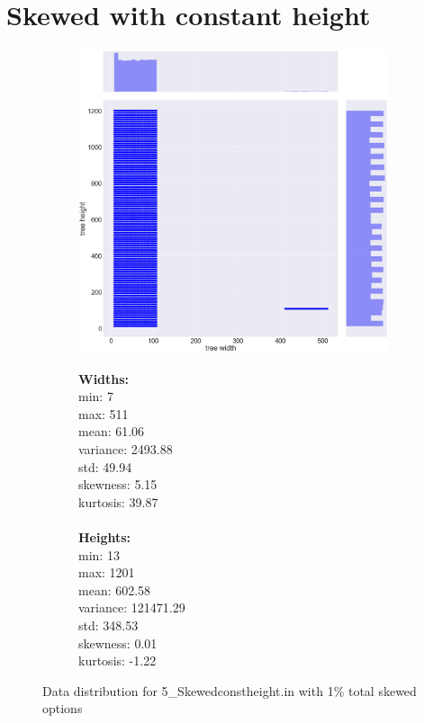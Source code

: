 \section{Skewed with constant height}
\begin{figure}[H]
\centering
\begin{subfigure}{.8\textwidth}
	\includegraphics[width=.9\textwidth]{img/5_SKEWEDCONSTHEIGHT_plot.png}
\end{subfigure}%
\begin{subfigure}{.2\textwidth}
  \centering
  \begin{minipage}{1\textwidth}
\textbf{Widths:}
\\
min: 7
\\
max: 511
\\
mean: 61.06
\\
variance: 2493.88
\\
std: 49.94
\\
skewness: 5.15
\\
kurtosis: 39.87
\\\\
\textbf{Heights:}
\\
min: 13
\\
max: 1201
\\
mean: 602.58
\\
variance: 121471.29
\\
std: 348.53
\\
skewness: 0.01
\\
kurtosis: -1.22
  \end{minipage}
\end{subfigure}
\caption{Data distribution for 5\_Skewedconstheight.in with 1\% total skewed options}
\label{appendix:data:skewedconstheight}
\end{figure}
